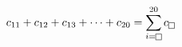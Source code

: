 $c_{11}+c_{12}+c_{13}+\cdots+c_{20}=\displaystyle\sum_{i=\text{\setlength{\fboxsep}{0.8pt}\framebox[5.6pt]{\rule{0pt}{3.2pt}}}}^{20} c_{\text{\setlength{\fboxsep}{0.8pt}\framebox[5.6pt]{\rule{0pt}{3.2pt}}}}$
